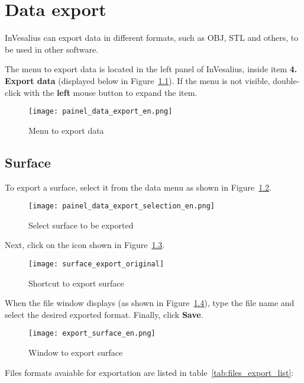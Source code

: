 \chapter{Data export}

InVesalius can export data in different formats, such as OBJ, STL and others, to be used in other software.

The menu to export data is located in the left panel of InVesalius, inside item \textbf{4. Export data} (displayed below in Figure~\ref{fig:data_export}). If the menu is not visible, double-click with the \textbf{left} mouse button to expand the item.

\begin{figure}[!htb]
\centering
\texttt{[image: painel\_data\_export\_en.png]}
\caption{Menu to export data}
\label{fig:data_export}
\end{figure}

\section{Surface}

To export a surface, select it from the data menu as shown in Figure~\ref{fig:data_export_selection}.

\newpage

\begin{figure}[!htb]
\centering
\texttt{[image: painel\_data\_export\_selection\_en.png]}
\caption{Select surface to be exported}
\label{fig:data_export_selection}
\end{figure}

Next, click on the icon shown in Figure~\ref{fig:surface_export_original}.

\begin{figure}[!htb]
\centering
\texttt{[image: surface\_export\_original]}
\caption{Shortcut to export surface}
\label{fig:surface_export_original}
\end{figure}

When the file window displays (as shown in Figure~\ref{fig:export_data_window}), type the file name and select the desired exported format. Finally, click \textbf{Save}.

\begin{figure}[!htb]
\centering
\texttt{[image: export\_surface\_en.png]}
\caption{Window to export surface}
\label{fig:export_data_window}
\end{figure}

Files formats avaiable for exportation are listed in table~\ref{tab:files_export_list}:

